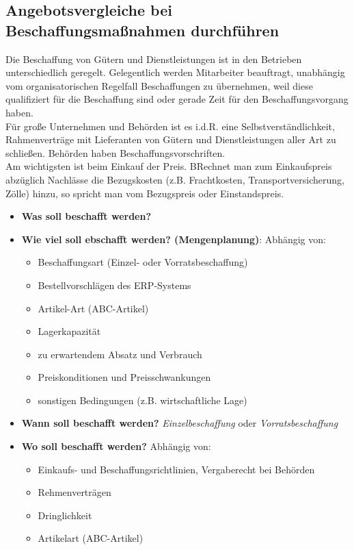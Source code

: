 \documentclass[a4paper, 12pt]{report}
\begin{document}
\begin{multicols}{2}

\section{Angebotsvergleiche bei Beschaffungsmaßnahmen durchführen}

Die Beschaffung von Gütern und Dienstleistungen ist in den Betrieben
unterschiedlich geregelt. Gelegentlich werden Mitarbeiter beauftragt, unabhängig
vom organisatorischen Regelfall Beschaffungen zu übernehmen, weil diese
qualifiziert für die Beschaffung sind oder gerade Zeit für den
Beschaffungsvorgang haben. \\

Für große Unternehmen und Behörden ist es i.d.R. eine Selbstverständlichkeit,
Rahmenverträge mit Lieferanten von Gütern und Dienstleistungen aller Art zu
schließen. Behörden haben Beschaffungsvorschriften. \\

Am wichtigsten ist beim Einkauf der Preis. BRechnet man zum Einkaufspreis
abzüglich Nachlässe die Bezugskosten (z.B. Frachtkosten, Transportversicherung,
Zölle) hinzu, so spricht man vom Bezugspreis oder Einstandspreis. \\

\begin{itemize}
    \item \textbf{Was soll beschafft werden?}
    \item \textbf{Wie viel soll ebschafft werden? (Mengenplanung)}: Abhängig
	von:
    \begin{itemize}
	\item Beschaffungsart (Einzel- oder Vorratsbeschaffung)
	\item Bestellvorschlägen des ERP-Systems
	\item Artikel-Art (ABC-Artikel)
	\item Lagerkapazität
	\item zu erwartendem Absatz und Verbrauch
	\item Preiskonditionen und Preisschwankungen
	\item sonstigen Bedingungen (z.B. wirtschaftliche Lage)
    \end{itemize}
    \item \textbf{Wann soll beschafft werden?} \emph{Einzelbeschaffung} oder
	\emph{Vorratsbeschaffung}
    \item \textbf{Wo soll beschafft werden?} Abhängig von:
    \begin{itemize}
	\item Einkaufs- und Beschaffungsrichtlinien, Vergaberecht bei Behörden
	\item Rehmenverträgen
	\item Dringlichkeit
	\item Artikelart (ABC-Artikel)
    \end{itemize}
\end{itemize}


\end{multicols}
\end{document}
